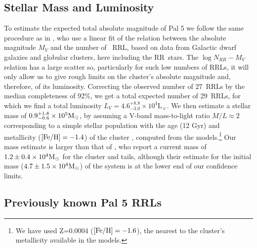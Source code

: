 \documentclass[twocolumn]{aastex63}
\newcommand{\sa}[1]{{\color{teal} SP: #1}}
\begin{document}
\subsection{Stellar Mass and Luminosity}

To estimate the expected total absolute magnitude of Pal 5 we follow the same procedure as in \citet{Mateu:2018}, who use a linear fit of the relation between the absolute magnitude $M_V$ and the number of \typeab\ RRL, based on data from Galactic dwarf galaxies and globular clusters, here including the RR\typec~stars.
The $\log{N_{RR}}-M_V$ relation has a large scatter so, particularly for such low numbers of RRLs, it will only allow us to give rough limits on the cluster's absolute magnitude and, therefore, of its luminosity. Correcting the observed number of 27~RRLs by the median completeness of 92\%, we get a total expected number of 29~RRLs, for which we find a total luminosity $L_V=4.6_{-3.0}^{+8.8}\times 10^4 \mathrm{L}_\sun$.
We then estimate a stellar mass of $0.9_{-0.6}^{+1.8}\times 10^5 \mathrm{M}_\odot$, by assuming a V-band mass-to-light ratio $M/L \approx 2$ \citep{Baumgardt:2019} corresponding to a simple stellar population with the age (12 Gyr) and metallicity ($[\mathrm{Fe}/\mathrm{H}]=-1.4$) of the cluster \citep{Dotter:2011}, computed from the \citet{Bruzual:2003} models.\footnote{We have used Z=0.0004 ($[\mathrm{Fe}/\mathrm{H}]=-1.6$), the nearest to the cluster's metallicity available in the models.}
Our mass estimate is larger than that of \citet{Ibata:2017}, who report a current mass of $1.2\pm 0.4 \times10^4\mathrm{M}_\odot$ for the cluster and tails, although their estimate for the initial mass ($4.7\pm 1.5\times10^4\mathrm{M}_\odot$) of the system is at the lower end of our confidence limits.






\subsection{Previously known Pal 5 RRLs}
\end{document}
